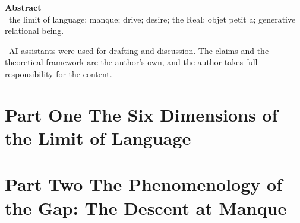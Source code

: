 \documentclass[11pt,a4paper]{article}
\begin{document}
\thispagestyle{empty}
\noindent\textbf{\large\color{rosedeep} Abstract}\\[0.6em]


\vspace{1.2em}
\, \textcolor{inksoft}{the limit of language; manque; drive; desire; the Real; objet petit a; generative relational being.}

\vspace{1.0em}
\, \textcolor{inksoft}{AI assistants were used for drafting and discussion. The claims and the theoretical framework are the author's own, and the author takes full responsibility for the content.}
\newpage

\tableofcontents
\newpage

\part*{\textcolor{rosedeep}{Part One \quad The Six Dimensions of the Limit of Language}}


\part*{\textcolor{rosedeep}{Part Two \quad The Phenomenology of the Gap: The Descent at Manque}}
\end{document}

